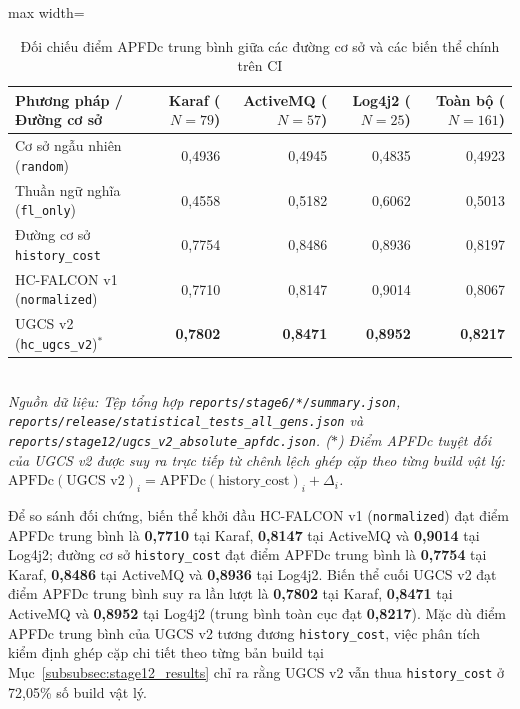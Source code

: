 \begin{table}[H]
\centering
\caption{Đối chiếu điểm APFDc trung bình giữa các đường cơ sở và các biến thể chính trên CI}
\label{tab:lrts_baseline_comparison}
\small
\begin{adjustbox}{max width=\textwidth}
\begin{tabular}{lrrrr}
\toprule
\textbf{Phương pháp / Đường cơ sở} & \textbf{Karaf ($N=79$)} & \textbf{ActiveMQ ($N=57$)} & \textbf{Log4j2 ($N=25$)} & \textbf{Toàn bộ ($N=161$)} \\
\midrule
Cơ sở ngẫu nhiên (\texttt{random})    & 0,4936 & 0,4945 & 0,4835 & 0,4923 \\
Thuần ngữ nghĩa (\texttt{fl\_only})   & 0,4558 & 0,5182 & 0,6062 & 0,5013 \\
Đường cơ sở \texttt{history\_cost}    & 0,7754 & 0,8486 & 0,8936 & 0,8197 \\
\midrule
HC-FALCON v1 (\texttt{normalized})   & 0,7710 & 0,8147 & 0,9014 & 0,8067 \\
UGCS v2 (\texttt{hc\_ugcs\_v2})$^{*}$ & \textbf{0,7802} & \textbf{0,8471} & \textbf{0,8952} & \textbf{0,8217} \\
\bottomrule
\end{tabular}
\end{adjustbox}
\vspace{1mm}\\
\footnotesize{\textit{Nguồn dữ liệu: Tệp tổng hợp \texttt{reports/stage6/*/summary.json}, \texttt{reports/release/statistical\_tests\_all\_gens.json} và \texttt{reports/stage12/ugcs\_v2\_absolute\_apfdc.json}. ($*$) Điểm APFDc tuyệt đối của UGCS v2 được suy ra trực tiếp từ chênh lệch ghép cặp theo từng build vật lý: $\text{APFDc}(\text{UGCS v2})_i = \text{APFDc}(\text{history\_cost})_i + \Delta_i$.}}
\end{table}

Để so sánh đối chứng, biến thể khởi đầu HC-FALCON v1 (\texttt{normalized}) đạt điểm APFDc trung bình là \textbf{0,7710} tại Karaf, \textbf{0,8147} tại ActiveMQ và \textbf{0,9014} tại Log4j2; đường cơ sở \texttt{history\_cost} đạt điểm APFDc trung bình là \textbf{0,7754} tại Karaf, \textbf{0,8486} tại ActiveMQ và \textbf{0,8936} tại Log4j2. Biến thể cuối UGCS v2 đạt điểm APFDc trung bình suy ra lần lượt là \textbf{0,7802} tại Karaf, \textbf{0,8471} tại ActiveMQ và \textbf{0,8952} tại Log4j2 (trung bình toàn cục đạt \textbf{0,8217}). Mặc dù điểm APFDc trung bình của UGCS v2 tương đương \texttt{history\_cost}, việc phân tích kiểm định ghép cặp chi tiết theo từng bản build tại Mục~\ref{subsubsec:stage12_results} chỉ ra rằng UGCS v2 vẫn thua \texttt{history\_cost} ở 72,05\% số build vật lý.

